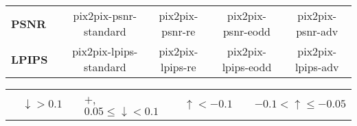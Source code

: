\begin{table}[]
\begin{tabular}{ll|c|cccc}
    \multicolumn{2}{l|}{\textbf{PSNR}} & \cellcolor[HTML]{C0C0C0} & pix2pix-psnr-standard & pix2pix-psnr-re & pix2pix-psnr-eodd & pix2pix-psnr-adv \\
    \cline{1-2}
    
    \multicolumn{2}{l|}{\textbf{LPIPS}} & \cellcolor[HTML]{C0C0C0} & pix2pix-lpips-standard & pix2pix-lpips-re & pix2pix-lpips-eodd & pix2pix-lpips-adv \\
    \hline
    \end{tabular}
    
    \begin{tabular}{llllllll} 
        \cellcolor[HTML]{E6C321} & $ \downarrow > 0.1$ & 
        \cellcolor[HTML]{F1D892} &$+$, $0.05 \leq \downarrow < 0.1$ & 
        \cellcolor[HTML]{3089A2} & $\uparrow < -0.1$  & 
        \cellcolor[HTML]{93C1C9} & $-0.1 < \uparrow \leq -0.05$ \\
    \end{tabular}
\end{table}

